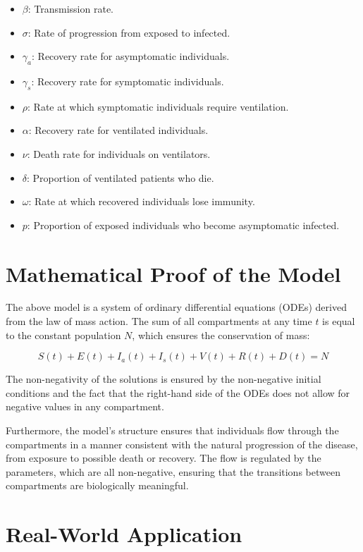 \documentclass[lettersize, journal]{IEEEtran}
\begin{document}
\begin{itemize}
    \item \( \beta \): Transmission rate.
    \item \( \sigma \): Rate of progression from exposed to infected.
    \item \( \gamma_a \): Recovery rate for asymptomatic individuals.
    \item \( \gamma_s \): Recovery rate for symptomatic individuals.
    \item \( \rho \): Rate at which symptomatic individuals require ventilation.
    \item \( \alpha \): Recovery rate for ventilated individuals.
    \item \( \nu \): Death rate for individuals on ventilators.
    \item \( \delta \): Proportion of ventilated patients who die.
    \item \( \omega \): Rate at which recovered individuals lose immunity.
    \item \( p \): Proportion of exposed individuals who become asymptomatic infected.
\end{itemize}

\section{Mathematical Proof of the Model}

The above model is a system of ordinary differential equations (ODEs) derived from the law of mass action. The sum of all compartments at any time \( t \) is equal to the constant population \( N \), which ensures the conservation of mass:

\[
S(t) + E(t) + I_a(t) + I_s(t) + V(t) + R(t) + D(t) = N
\]

The non-negativity of the solutions is ensured by the non-negative initial conditions and the fact that the right-hand side of the ODEs does not allow for negative values in any compartment. 

Furthermore, the model's structure ensures that individuals flow through the compartments in a manner consistent with the natural progression of the disease, from exposure to possible death or recovery. The flow is regulated by the parameters, which are all non-negative, ensuring that the transitions between compartments are biologically meaningful.

\section{Real-World Application}
\end{document}
